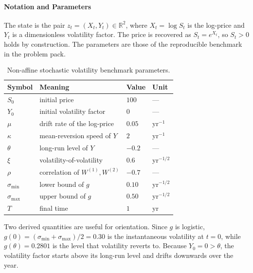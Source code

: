 \documentclass[11pt,a4paper]{article}
\theoremstyle{definition}
\theoremstyle{remark}
\begin{document}
\paragraph{Notation and Parameters}
The state is the pair $z_t = (X_t, Y_t) \in \mathbb{R}^2$, where $X_t = \log S_t$ is the log-price and $Y_t$ is a dimensionless volatility factor. The price is recovered as $S_t = e^{X_t}$, so $S_t > 0$ holds by construction. The parameters are those of the reproducible benchmark in the problem pack.
\begin{table}[H]
\centering
\begin{tabular}{llll}
\toprule
\textbf{Symbol} & \textbf{Meaning} & \textbf{Value} & \textbf{Unit} \\
\midrule
$S_0$                         & initial price                  & $100$  & --- \\
$Y_0$                         & initial volatility factor      & $0$    & --- \\
$\mu$                         & drift rate of the log-price    & $0.05$ & yr$^{-1}$ \\
$\kappa$                      & mean-reversion speed of $Y$    & $2$    & yr$^{-1}$ \\
$\theta$                      & long-run level of $Y$          & $-0.2$ & --- \\
$\xi$                         & volatility-of-volatility       & $0.6$  & yr$^{-1/2}$ \\
$\rho$                        & correlation of $W^{(1)}, W^{(2)}$ & $-0.7$ & --- \\
$\sigma_{\min}$               & lower bound of $g$             & $0.10$ & yr$^{-1/2}$ \\
$\sigma_{\max}$               & upper bound of $g$             & $0.50$ & yr$^{-1/2}$ \\
$T$                           & final time                     & $1$    & yr \\
\bottomrule
\end{tabular}
\caption{Non-affine stochastic volatility benchmark parameters.}
\label{tab:nasv-params}
\end{table}
Two derived quantities are useful for orientation. Since $g$ is logistic, $g(0) = (\sigma_{\min} + \sigma_{\max})/2 = 0.30$ is the instantaneous volatility at $t = 0$, while $g(\theta) = 0.2801$ is the level that volatility reverts to. Because $Y_0 = 0 > \theta$, the volatility factor starts above its long-run level and drifts downwards over the year.
\end{document}
